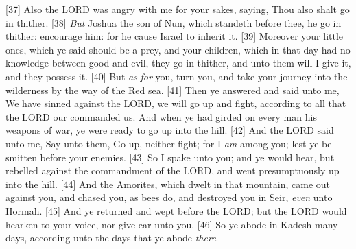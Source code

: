 [37] \textcolor[cmyk]{0.99998,1,0,0}{Also the LORD was angry with me for your sakes, saying, Thou also shalt  go in thither.}
[38] \textcolor[cmyk]{0.99998,1,0,0}{\emph{But} Joshua the son of Nun, which standeth before thee, he  go in thither: encourage him: for he  cause Israel to inherit it.}
[39] \textcolor[cmyk]{0.99998,1,0,0}{Moreover your little ones, which ye said should be a prey, and your children, which in that day had no knowledge between good and evil, they  go in thither, and unto them will I give it, and they  possess it.}
[40] \textcolor[cmyk]{0.99998,1,0,0}{But \emph{as} \emph{for} you, turn you, and take your journey into the wilderness by the way of the Red sea.}
[41] \textcolor[cmyk]{0.99998,1,0,0}{Then ye answered and said unto me, We have sinned against the LORD, we will go up and fight, according to all that the LORD our  commanded us. And when ye had girded on every man his weapons of war, ye were ready to go up into the hill.}
[42] \textcolor[cmyk]{0.99998,1,0,0}{And the LORD said unto me, Say unto them, Go  up, neither fight; for I \emph{am}  among you; lest ye be smitten before your enemies.}
[43] \textcolor[cmyk]{0.99998,1,0,0}{So I spake unto you; and ye would  hear, but rebelled against the commandment of the LORD, and went presumptuously up into the hill.}
[44] \textcolor[cmyk]{0.99998,1,0,0}{And the Amorites, which dwelt in that mountain, came out against you, and chased you, as bees do, and destroyed you in Seir, \emph{even} unto Hormah.}
[45] \textcolor[cmyk]{0.99998,1,0,0}{And ye returned and wept before the LORD; but the LORD would  hearken to your voice, nor give ear unto you.}
[46] \textcolor[cmyk]{0.99998,1,0,0}{So ye abode in Kadesh many days, according unto the days that ye abode \emph{there}.}